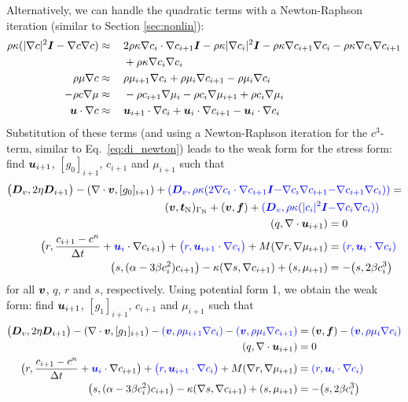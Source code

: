 Alternatively, we can handle the quadratic terms with a Newton-Raphson
iteration (similar to Section \ref{sec:nonlin}):
\begin{alignat*}{3}
\rho \kappa (|\nabla c|^2 \boldsymbol{I} -\nabla c \nabla c) &\approx 
&& 2\rho \kappa \nabla c_i \cdot \nabla c_{i+1} \boldsymbol{I} -\rho \kappa 
|\nabla c_i|^2 \boldsymbol{I}-\rho \kappa \nabla c_{i+1} \nabla c_i -\rho \kappa 
\nabla c_i \nabla c_{i+1}\\
&\quad\; &&+ \rho \kappa \nabla c_i \nabla c_i\\
\rho \mu \nabla c &\approx &&\rho \mu_{i+1} \nabla c_{i}+\rho \mu_{i} 
\nabla c_{i+1} - \rho \mu_{i} \nabla c_{i} \\
-\rho c \nabla \mu &\approx &&-\rho c_{i+1} \nabla \mu_{i}-\rho c_{i} 
\nabla \mu_{i+1} + \rho c_{i} \nabla \mu_{i} \\
\boldsymbol{u} \cdot \nabla c &\approx &&\boldsymbol{u}_{i+1} \cdot \nabla c_{i} + \boldsymbol{u}_{i} 
\cdot \nabla c_{i+1} - \boldsymbol{u}_{i} \cdot \nabla c_{i} 
\end{alignat*}
Substitution of these terms (and using a Newton-Raphson iteration for the 
$c^3$-term, similar to Eq.~\eqref{eq:di_newton}) 
leads to the weak form for the stress form:
find $\boldsymbol{u}_{i+1}$, $[g_0]_{i+1}$, $c_{i+1}$ and $\mu_{i+1}$ such that
\begin{align*}
\big(\boldsymbol{D}_v,2\eta \boldsymbol{D}_{i+1} \big) - (\nabla\cdot\boldsymbol{v},[g_0]_{i+1})
+\textcolor{blue}{(\boldsymbol{D}_v, \rho \kappa(2\nabla c_i \cdot \nabla c_{i+1} \boldsymbol{I} }
\textcolor{blue}{-\nabla c_i \nabla c_{i+1}}&\textcolor{blue}{-\nabla c_{i+1} \nabla c_{i}))}=\\
(\boldsymbol{v},\boldsymbol{t}_{\text{N}})_{\Gamma_{\text{N}}}+(\boldsymbol{v}, \boldsymbol{f}) 
+\textcolor{blue}{(\boldsymbol{D}_v, \rho \kappa (|c_i|^2\boldsymbol{I}}&\textcolor{blue}{-\nabla c_i 
	\nabla c_i))}\\
(q,\nabla\cdot\boldsymbol{u}_{i+1})&=0\\
\big(r,\frac{c_{i+1}-c^n}{\Delta t}+\textcolor{blue}{\boldsymbol{u}_i}\cdot\nabla c_{i+1}\big)
+\textcolor{blue}{\big(r, \boldsymbol{u}_{i+1} \cdot \nabla c_i \big)}+M(\nabla 
r,\nabla \mu_{i+1})&=\textcolor{blue}{(r, \boldsymbol{u}_i \cdot \nabla c_i)} \\
\big(s, (\alpha -3\beta c_{i}^2)c_{i+1}\big)-\kappa(\nabla s,\nabla c_{i+1})
+(s,\mu_{i+1})&=-\big(s,2\beta c_{i}^3 \big)
\end{align*}
for all $\boldsymbol{v}$, $q$, $r$ and $s$, respectively. Using potential form 1, we 
obtain the weak form:
find $\boldsymbol{u}_{i+1}$, $[g_1]_{i+1}$, $c_{i+1}$ and $\mu_{i+1}$ such that
\begin{alignat*}{6}
\big(\boldsymbol{D}_v,2\eta \boldsymbol{D}_{i+1} \big)-(\nabla\cdot\boldsymbol{v},[g_1]_{i+1})
-\textcolor{blue}{(\boldsymbol{v},\rho \mu_{i+1}\nabla c_{i})}-\textcolor{blue}{( \boldsymbol{v},\rho \mu_{i}
	\nabla c_{i+1})}&=(\boldsymbol{v},\boldsymbol{f})-\textcolor{blue}{(\boldsymbol{v},\rho \mu_{i}\nabla c_{i})}\\
(q,\nabla\cdot\boldsymbol{u}_{i+1})&=0\\
\big(r,\frac{c_{i+1}-c^n}{\Delta t}+\textcolor{blue}{\boldsymbol{u}_i}\cdot\nabla c_{i+1}\big)
+\textcolor{blue}{\big(r, \boldsymbol{u}_{i+1} \cdot \nabla c_i \big)}+M(\nabla r,\nabla 
\mu_{i+1})&=\textcolor{blue}{(r, \boldsymbol{u}_i \cdot \nabla c_i)} \\
\big(s, (\alpha -3\beta c_{i}^2)c_{i+1}\big)-\kappa(\nabla s,\nabla c_{i+1}) 
+(s,\mu_{i+1})&=-\big(s, 2\beta c_{i}^3 \big)
\end{alignat*}
